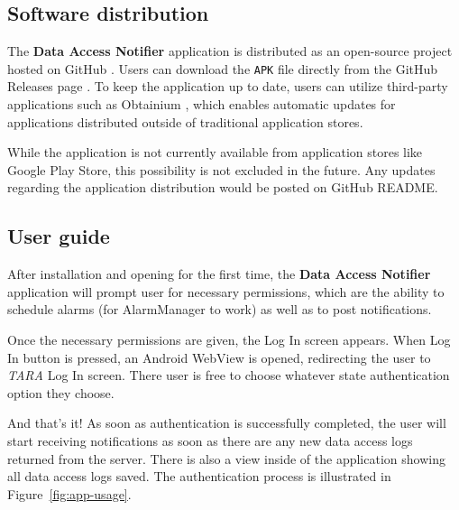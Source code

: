 \subsection{Software distribution}

The \textbf{Data Access Notifier} application is distributed as an open-source project hosted on GitHub \cite{data-access-notifier}. Users can download the \texttt{APK} file directly from the GitHub Releases page \cite{data-access-notifier-releases}. To keep the application up to date, users can utilize third-party applications such as Obtainium \cite{obtainium}, which enables automatic updates for applications distributed outside of traditional application stores.

While the application is not currently available from application stores like Google Play Store, this possibility is not excluded in the future. Any updates regarding the application distribution would be posted on GitHub README.

\subsection{User guide}
After installation and opening for the first time, the \textbf{Data Access Notifier} application will prompt user for necessary permissions, which are the ability to schedule alarms (for AlarmManager to work) as well as to post notifications.

Once the necessary permissions are given, the Log In screen appears. When Log In button is pressed, an Android WebView is opened, redirecting the user to \textit{TARA} Log In screen. There user is free to choose whatever state authentication option they choose.

And that's it! As soon as authentication is successfully completed, the user will start receiving notifications as soon as there are any new data access logs returned from the server. There is also a view inside of the application showing all data access logs saved. The authentication process is illustrated in Figure~\ref{fig:app-usage}.

